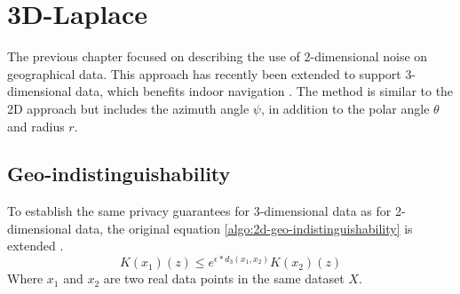 \section{3D-Laplace}
The previous chapter focused on describing the use of 2-dimensional noise on geographical data.
This approach has recently been extended to support 3-dimensional data, which benefits indoor navigation \citep{9646489}.
The method is similar to the 2D approach but includes the azimuth angle $\psi$, in addition to the polar angle $\theta$ and radius $r$.

\subsection{Geo-indistinguishability}
To establish the same privacy guarantees for 3-dimensional data as for 2-dimensional data, the original equation \ref{algo:2d-geo-indistinguishability} is extended \citep{9646489}.
\begin{equation}
  K(x_1)(z) \le e^{\epsilon * d_3(x_1, x_2)} K(x_2)(z)
  \label{algo:3d-geo-indistinguishability}
\end{equation}
Where $x_1$ and $x_2$ are two real data points in the same dataset $X$.
